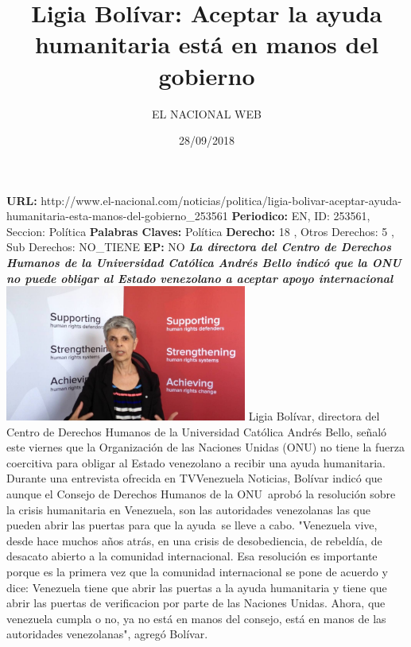 \documentclass{article}%
\title{\textbf{Ligia Bolívar: Aceptar la ayuda humanitaria está en manos del gobierno}}%
\author{EL NACIONAL WEB}%
\date{28/09/2018}%
\begin{document}
%
\normalsize%
\maketitle%
\textbf{URL: }%
http://www.el{-}nacional.com/noticias/politica/ligia{-}bolivar{-}aceptar{-}ayuda{-}humanitaria{-}esta{-}manos{-}del{-}gobierno\_253561\newline%
%
\textbf{Periodico: }%
EN, %
ID: %
253561, %
Seccion: %
Política\newline%
%
\textbf{Palabras Claves: }%
Política\newline%
%
\textbf{Derecho: }%
18%
, Otros Derechos: %
5%
, Sub Derechos: %
NO\_TIENE%
\newline%
%
\textbf{EP: }%
NO\newline%
\newline%
%
\textbf{\textit{La directora del Centro de Derechos Humanos de la Universidad Católica Andrés Bello indicó que la ONU no puede obligar al Estado venezolano a aceptar apoyo internacional}}%
\newline%
\newline%
%
\includegraphics[width=300px]{121.jpg}%
\newline%
%
Ligia Bolívar, directora del Centro de Derechos Humanos de la Universidad Católica Andrés Bello, señaló este viernes que la Organización de las Naciones Unidas (ONU) no tiene la fuerza coercitiva para obligar al Estado venezolano a recibir una ayuda humanitaria.%
\newline%
%
Durante una entrevista ofrecida en TVVenezuela Noticias, Bolívar indicó que aunque el Consejo de Derechos Humanos de la ONU~aprobó la resolución sobre la crisis humanitaria en Venezuela, son las autoridades venezolanas las que pueden abrir las puertas para que la ayuda~se lleve a cabo.%
\newline%
%
"Venezuela vive, desde hace muchos años atrás, en una crisis de desobediencia, de rebeldía, de desacato abierto a la comunidad internacional. Esa resolución es importante porque es la primera vez que la comunidad internacional se pone de acuerdo y dice: Venezuela tiene que abrir las puertas a la ayuda humanitaria y tiene que abrir las puertas de verificacion por parte de las Naciones Unidas. Ahora, que venezuela cumpla o no, ya no está en manos del consejo, está en manos de las autoridades venezolanas", agregó Bolívar.%
\newline%
%
\end{document}
